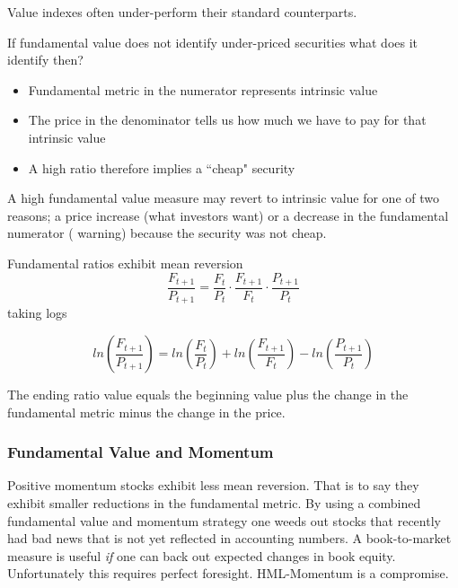 Value indexes often under-perform their standard counterparts.

If fundamental value does not identify under-priced securities what does it 
identify then?
\begin{itemize}
  \item Fundamental metric in the numerator represents intrinsic value
  \item The price in the denominator tells us how much we have to pay for that 
  intrinsic value
  \item A high ratio therefore implies a ``cheap" security
\end{itemize}
A high fundamental value measure may revert to intrinsic value for one of two 
reasons;
a price increase (what investors want) or
a decrease in the fundamental numerator (\cite{graham1934security} warning) 
because the security was not cheap.

Fundamental ratios exhibit mean reversion
\[
\frac{F_{t+1}}{P_{t+1}}=\frac{F_t}{P_t}\cdot\frac{F_{t+1}}{F_t}\cdot\frac{P_{t+1}}{P_t}
\]
taking logs

\[
ln\left(\frac{F_{t+1}}{P_{t+1}}\right) =ln\left(\frac{F_t}{P_t}\right) 
+ln\left(\frac{F_{t+1}}{F_t}\right) -ln\left(\frac{P_{t+1}}{P_t}\right)
\]

The ending ratio value equals the beginning value plus the change in the 
fundamental metric minus the change in the price.

\subsubsection{Fundamental Value and Momentum}

Positive momentum stocks exhibit less mean reversion.
That is to say they exhibit smaller reductions in the fundamental metric.
By using a combined fundamental value and momentum strategy one weeds out 
stocks that recently had bad news that is not yet reflected in accounting 
numbers.
A book-to-market measure is useful \emph{if} one can back out expected changes 
in book equity.
Unfortunately this requires perfect foresight.
HML-Momentum is a compromise.

